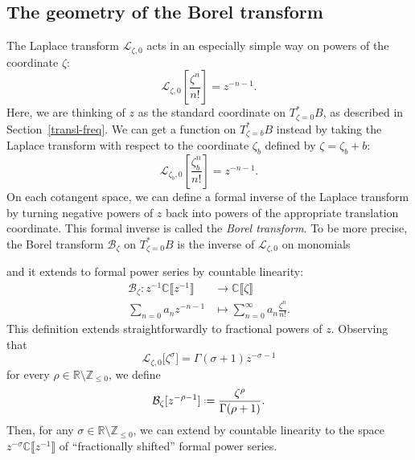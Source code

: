 \documentclass{article}
\newcommand{\maps}{\colon}
\newcommand{\Z}{\mathbb{Z}}
\newcommand{\R}{\mathbb{R}}
\newcommand{\C}{\mathbb{C}}
\newcommand*{\defeq}{\mathrel{\vcenter{\baselineskip0.5ex \lineskiplimit0pt
                     \hbox{\scriptsize.}\hbox{\scriptsize.}}}%
                     =}
\newcommand{\laplace}{\mathcal{L}}
\newcommand{\borel}{\mathcal{B}}
\theoremstyle{definition}
\theoremstyle{plain}
\begin{document}
\subsection{The geometry of the Borel transform}\label{sec:geometry_borel}
%
The Laplace transform $\laplace_{\zeta, 0}$ acts in an especially simple way on powers of the coordinate $\zeta$:
\[ \laplace_{\zeta, 0}\left[\frac{\zeta^n}{n!}\right] = z^{-n-1}. \]
Here, we are thinking of $z$ as the standard coordinate on $T^*_{\zeta = 0}B$, as described in Section~\ref{transl-freq}. We can get a function on $T^*_{\zeta = b}B$ instead by taking the Laplace transform with respect to the coordinate $\zeta_b$ defined by $\zeta = \zeta_b + b$:
\[ \laplace_{\zeta_b, 0}\left[\frac{\zeta_b^n}{n!}\right] = z^{-n-1}. \]
On each cotangent space, we can define a formal inverse of the Laplace transform by turning negative powers of $z$ back into powers of the appropriate translation coordinate. This formal inverse is called the {\em Borel transform}. To be more precise, the Borel transform $\borel_\zeta$ on $T^*_{\zeta = 0}B$ is the inverse of $\laplace_{\zeta,0}$ on monomials 
\begin{center}
\end{center}
and it extends to formal power series by countable linearity:
\begin{align*}
\borel_\zeta \maps z^{-1} \C \llbracket z^{-1} \rrbracket & \to \C \llbracket \zeta \rrbracket \\
\sum_{n=0}a_n z^{-n-1} & \mapsto \sum_{n=0}^\infty a_n \frac{\zeta^n}{n!}.
\end{align*}
This definition extends straightforwardly to fractional powers of $z$. Observing that   
\[\laplace_{\zeta,0}\big[\zeta^\sigma\big]=\Gamma(\sigma+1)z^{-\sigma-1}\]
for every $\rho \in \R \setminus \Z_{\leq 0}$, we define 
\begin{align*}
\borel_\zeta[z^{-\rho-1}] \defeq \frac{\zeta^{\rho}}{\Gamma(\rho+1)}.
\end{align*}
Then, for any $\sigma \in \R \setminus \Z_{\leq 0}$, we can extend by countable linearity to the space $z^{-\sigma}\C\llbracket z^{-1}\rrbracket$ of ``fractionally shifted'' formal power series.
\end{document}
